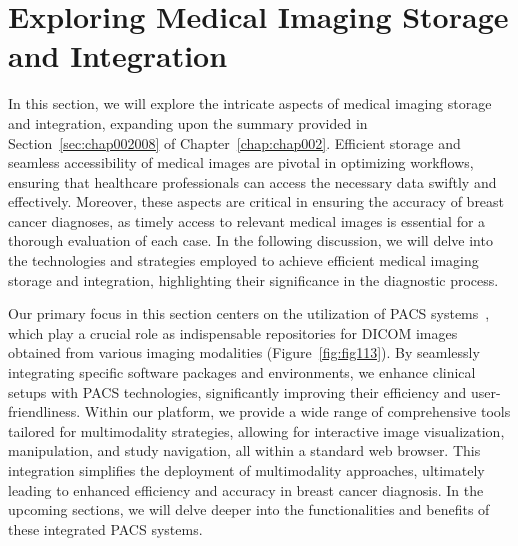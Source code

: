 \section{Exploring Medical Imaging Storage and Integration}
\label{sec:app001008}

\textcolor{revised}{In this section, we will explore the intricate aspects of medical imaging storage and integration, expanding upon the summary provided in Section~\ref{sec:chap002008} of Chapter~\ref{chap:chap002}.
Efficient storage and seamless accessibility of medical images are pivotal in optimizing workflows, ensuring that healthcare professionals can access the necessary data swiftly and effectively.
Moreover, these aspects are critical in ensuring the accuracy of breast cancer diagnoses, as timely access to relevant medical images is essential for a thorough evaluation of each case.
In the following discussion, we will delve into the technologies and strategies employed to achieve efficient medical imaging storage and integration, highlighting their significance in the diagnostic process.}

\textcolor{revised}{Our primary focus in this section centers on the utilization of \ac{PACS} systems~\cite{carter2018digital}, which play a crucial role as indispensable repositories for \ac{DICOM} images obtained from various imaging modalities (Figure~\ref{fig:fig113}).
By seamlessly integrating specific software packages and environments, we enhance clinical setups with \ac{PACS} technologies, significantly improving their efficiency and user-friendliness.
Within our platform, we provide a wide range of comprehensive tools tailored for multimodality strategies, allowing for interactive image visualization, manipulation, and study navigation, all within a standard web browser.
This integration simplifies the deployment of multimodality approaches, ultimately leading to enhanced efficiency and accuracy in breast cancer diagnosis.
In the upcoming sections, we will delve deeper into the functionalities and benefits of these integrated \ac{PACS} systems.}

